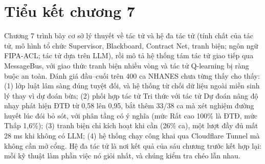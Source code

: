 \section{Tiểu kết chương 7}

Chương 7 trình bày cơ sở lý thuyết về tác tử và hệ đa tác tử (tính chất của tác tử, mô hình tổ chức Supervisor, Blackboard, Contract Net, tranh biện; ngôn ngữ FIPA-ACL; tác tử dựa trên LLM), rồi mô tả hệ thống tám tác tử giao tiếp qua MessageBus, với giao thức tranh biện nhiều vòng và tác tử Q-learning bị ràng buộc an toàn. Đánh giá đầu–cuối trên 400 ca NHANES chưa từng thấy cho thấy: (1) lớp luật lâm sàng đúng tuyệt đối, và hệ thống từ chối dữ liệu ngoài miền sinh lý thay vì dự đoán bừa; (2) phối hợp tác tử Tri thức với tác tử Dự đoán nâng độ nhạy phát hiện ĐTĐ từ 0,58 lên 0,95, bắt thêm 33/38 ca mà xét nghiệm đường huyết lúc đói bỏ sót, với phân tầng có ý nghĩa (mức Rất cao 100\% là ĐTĐ, mức Thấp 1,6\%); (3) tranh biện chỉ kích hoạt khi cần (26\% ca), một lượt đầy đủ mất 28 ms khi không có LLM; (4) hệ thống chạy công khai qua Cloudflare Tunnel mà không cần mở cổng. Hệ đa tác tử là nơi kết quả của sáu chương trước kết hợp lại: mỗi kỹ thuật làm phần việc nó giỏi nhất, và chúng kiểm tra chéo lẫn nhau.

